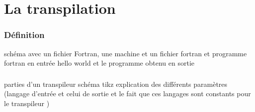 \section{La transpilation}

\begin{frame}
    \frametitle{Définition}
    schéma avec un fichier Fortran, une machine et un fichier fortran
    et 
    programme fortran en entrée hello world et le programme obtenu en sortie 
\end{frame}


\begin{frame}
    \frametitle{}
    parties d'un transpileur
    schéma tikz explication des différents paramètres (langage d'entrée et celui de sortie et le fait que ces langages sont constants pour le transpileur ) 
\end{frame}

